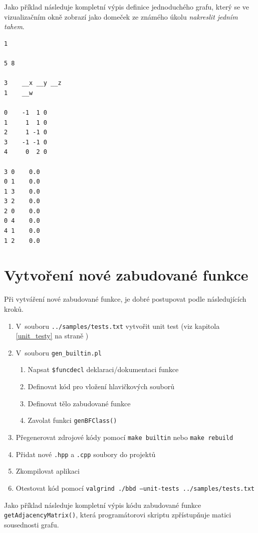 \documentclass[11pt,twoside,a4paper]{book}
\begin{document}
Jako příklad následuje kompletní výpis definice jednoduchého grafu, který se ve vizualizačním okně zobrazí jako domeček ze známého úkolu \textit{nakreslit jedním tahem}.

\begin{verbatim}
1

5 8

3    __x __y __z
1    __w

0    -1  1 0
1     1  1 0
2     1 -1 0
3    -1 -1 0
4     0  2 0

3 0    0.0
0 1    0.0
1 3    0.0
3 2    0.0
2 0    0.0
0 4    0.0
4 1    0.0
1 2    0.0
\end{verbatim}



\chapter{Vytvoření nové zabudované funkce}
\label{vytvoreni_nove_zabudovane_funkce}

Při vytváření nové zabudované funkce, je dobré postupovat podle následujících kroků.

\begin{enumerate}
\item V~souboru \texttt{../samples/tests.txt} vytvořit unit test (viz kapitola \ref{unit_testy} na straně \pageref{unit_testy})
\item V~souboru \texttt{gen\_builtin.pl}
\begin{enumerate}
\item Napsat \texttt{\$funcdecl} deklaraci/dokumentaci funkce
\item Definovat kód pro vložení hlavičkových souborů
\item Definovat tělo zabudované funkce
\item Zavolat funkci \texttt{genBFClass()}
\end{enumerate}
\item Přegenerovat zdrojové kódy pomocí \texttt{make builtin} nebo \texttt{make rebuild}
\item Přidat nové \texttt{.hpp} a \texttt{.cpp} soubory do projektů
\item Zkompilovat aplikaci
\item Otestovat kód pomocí \texttt{valgrind ./bbd --unit-tests ../samples/tests.txt}
\end{enumerate}

Jako příklad následuje kompletní výpis kódu zabudované funkce \texttt{getAdjacencyMatrix()}, která pro\-gra\-má\-to\-ro\-vi skriptu zpřístupňuje matici sousednosti grafu.
\end{document}
